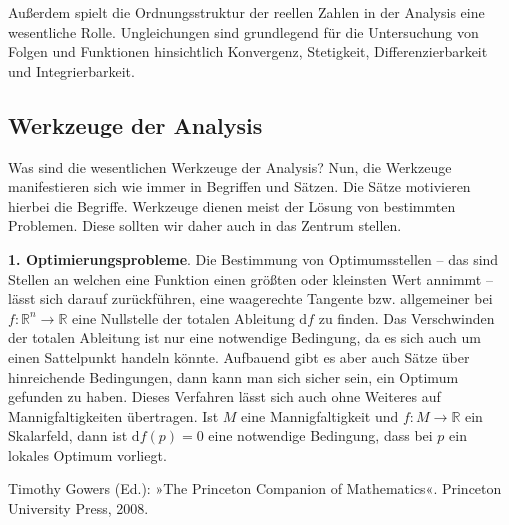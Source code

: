 \documentclass[a4paper,10pt,fleqn,twocolumn,twoside]{scrartcl}
\newcommand{\R}{\mathbb R}
\newcommand{\strong}[1]{\textsf{\textbf{#1}}}
\begin{document}
Außerdem spielt die Ordnungsstruktur der reellen Zahlen in der
Analysis eine wesentliche Rolle. Ungleichungen sind grundlegend
für die Untersuchung von Folgen und Funktionen hinsichtlich
Konvergenz, Stetigkeit, Differenzierbarkeit und Integrierbarkeit.

\subsection{Werkzeuge der Analysis}

Was sind die wesentlichen Werkzeuge der Analysis? Nun, die Werkzeuge
manifestieren sich wie immer in Begriffen und Sätzen. Die Sätze
motivieren hierbei die Begriffe. Werkzeuge dienen meist der Lösung
von bestimmten Problemen. Diese sollten wir daher auch in das Zentrum
stellen.

\strong{1. Optimierungsprobleme}. Die Bestimmung von Optimumsstellen
-- das sind Stellen an welchen eine Funktion einen größten oder
kleinsten Wert annimmt -- lässt sich darauf zurückführen, eine
waagerechte Tangente bzw. allgemeiner bei $f\colon\R^n\to\R$ eine
Nullstelle der totalen Ableitung $\mathrm df$ zu finden. Das
Verschwinden der totalen Ableitung ist nur eine notwendige Bedingung,
da es sich auch um einen Sattelpunkt handeln könnte. Aufbauend
gibt es aber auch Sätze über hinreichende Bedingungen, dann kann man
sich sicher sein, ein Optimum gefunden zu haben. Dieses Verfahren
lässt sich auch ohne Weiteres auf Mannigfaltigkeiten übertragen.
Ist $M$ eine Mannigfaltigkeit und $f\colon M\to\R$ ein Skalarfeld,
dann ist $\mathrm df(p)=0$ eine notwendige Bedingung, dass bei $p$
ein lokales Optimum vorliegt.

\begin{thebibliography}{0}
 Timothy Gowers (Ed.):
»The Princeton Companion of Mathematics«. Princeton University Press,
2008.
\end{thebibliography}
\end{document}
